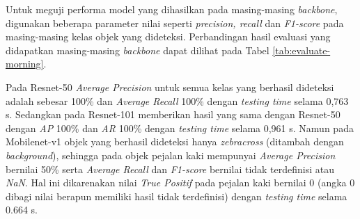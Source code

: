 Untuk meguji performa model yang dihasilkan pada masing-masing \textit{backbone}, digunakan beberapa parameter nilai seperti \textit{precision, recall} dan \textit{F1-score} pada masing-masing kelas objek yang dideteksi. Perbandingan hasil evaluasi yang didapatkan masing-masing \textit{backbone} dapat dilihat pada Tabel \ref{tab:evaluate-morning}.

Pada Resnet-50 \textit{Average Precision} untuk semua kelas yang berhasil dideteksi adalah sebesar 100\% dan \textit{Average Recall} 100\% dengan \textit{testing time} selama 0,763 s. Sedangkan pada Resnet-101 memberikan hasil yang sama dengan Resnet-50 dengan \textit{AP} 100\% dan \textit{AR} 100\% dengan \textit{testing time} selama 0,961 s. Namun pada Mobilenet-v1 objek yang berhasil dideteksi hanya \textit{zebracross} (ditambah dengan \textit{background}), sehingga pada objek pejalan kaki mempunyai \textit{Average Precision} bernilai 50\% serta \textit{Average Recall} dan \textit{F1-score} bernilai tidak terdefinisi atau \textit{NaN}. Hal ini dikarenakan nilai \textit{True Positif} pada pejalan kaki bernilai 0 (angka 0 dibagi nilai berapun memiliki hasil tidak terdefinisi) dengan \textit{testing time} selama 0.664 s.

